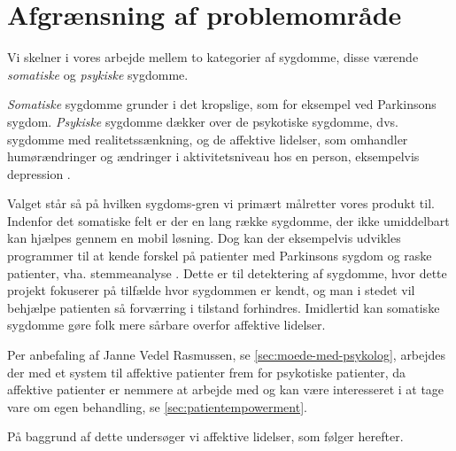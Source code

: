 \section{Afgrænsning af problemområde}\label{afgraensning_af_problemområde}
Vi skelner i vores arbejde mellem to kategorier af sygdomme, disse værende \textit{somatiske} og \textit{psykiske} sygdomme.

\textit{Somatiske} sygdomme grunder i det kropslige, som for eksempel ved Parkinsons sygdom.
\textit{Psykiske} sygdomme dækker over de psykotiske sygdomme, dvs. sygdomme med realitetssænkning, og de affektive lidelser, som omhandler humørændringer og ændringer i aktivitetsniveau hos en person, eksempelvis depression \citep{misc:netpsykpsykose}. 

Valget står så på hvilken sygdoms-gren vi primært målretter vores produkt til.
Indenfor det somatiske felt er der en lang række sygdomme, der ikke umiddelbart kan hjælpes gennem en mobil løsning.
Dog kan der eksempelvis udvikles programmer til at kende forskel på patienter med Parkinsons sygdom og raske patienter, vha. stemmeanalyse \citep{6168572}.
Dette er til detektering af sygdomme, hvor dette projekt fokuserer på tilfælde hvor sygdommen er kendt, og man i stedet vil behjælpe patienten så forværring i tilstand forhindres.
Imidlertid kan somatiske sygdomme gøre folk mere sårbare overfor affektive lidelser.

Per anbefaling af Janne Vedel Rasmussen, se \cref{sec:moede-med-psykolog}, arbejdes der med et system til affektive patienter frem for psykotiske patienter, da affektive patienter er nemmere at arbejde med og kan være interesseret i at tage vare om egen behandling, se \cref{sec:patientempowerment}.

På baggrund af dette undersøger vi affektive lidelser, som følger herefter.